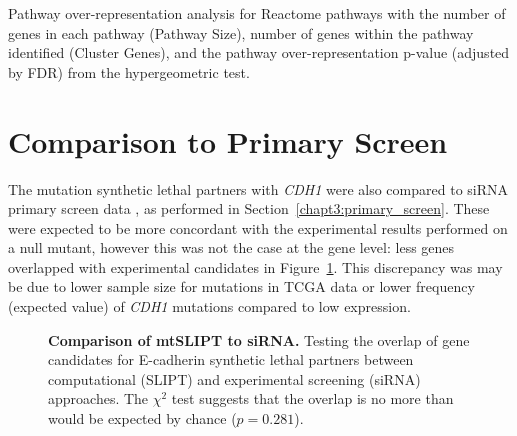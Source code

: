 \begin{table}[!hp]
{\begin{threeparttable}
\begin{tabular}{lccc}
  \hline
\end{tabular}
\begin{tablenotes}
\raggedright %
Pathway over-representation analysis for Reactome pathways with the number of genes in each pathway (Pathway Size), number of genes within the pathway identified (Cluster Genes), and the pathway over-representation p-value (adjusted by \gls{FDR}) from the hypergeometric test.  
\end{tablenotes}
\end{threeparttable}
}
\end{table}


\clearpage
\section{Comparison to Primary Screen}

The mutation synthetic lethal partners with \textit{CDH1} were also compared to \gls{siRNA} primary screen data \citep{Telford2015}, as performed in Section~\ref{chapt3:primary_screen}. These were expected to be more concordant with the experimental results performed on a null mutant, however this was not the case at the gene level: less genes overlapped with experimental candidates in Figure~\ref{fig:Venn_allgenes_mtSL}. This discrepancy was may be due to lower sample size for mutations in \gls{TCGA} data or lower frequency (expected value) of \textit{CDH1} mutations compared to low expression. 

\begin{figure}[!ht]
  \centering
    \caption[Comparison of \acrshort{mtSLIPT} to \gls{siRNA}]{\small \textbf{Comparison of \acrshort{mtSLIPT} to \gls{siRNA}.} Testing the overlap of gene candidates for \gls{E-cadherin} synthetic lethal partners between computational (SLIPT) and experimental screening (siRNA) approaches. The $\chi^2$ test suggests that the overlap is no more than would be expected by chance ($p = 0.281$). %
}
\label{fig:Venn_allgenes_mtSL}
\end{figure}

